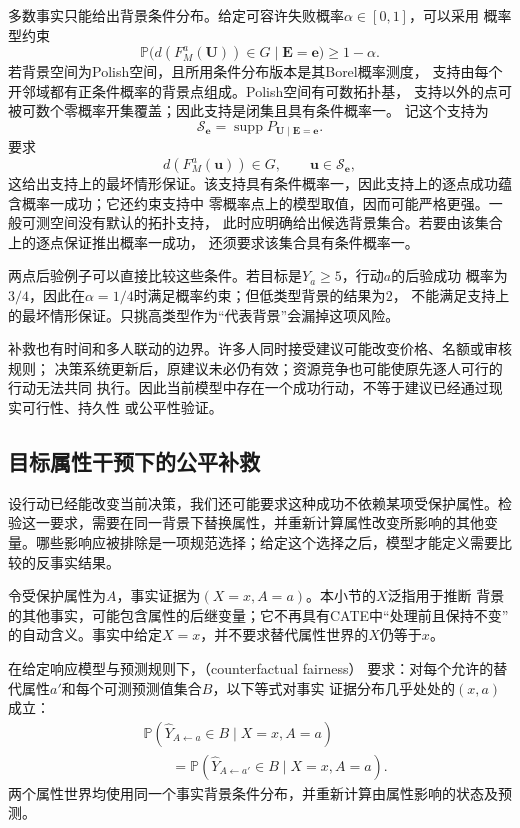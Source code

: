 多数事实只能给出背景条件分布。给定可容许失败概率\(\alpha\in[0,1]\)，可以采用
概率型约束
\begin{equation}
  \mathbb P\bigl(d(F_M^a(\bm U))\in G\mid\bm E=\bm e\bigr)
  \geq1-\alpha.
  \label{eq:causal-recourse-probability}
\end{equation}
若背景空间为Polish空间，且所用条件分布版本是其Borel概率测度，
支持由每个开邻域都有正条件概率的背景点组成。Polish空间有可数拓扑基，
支持以外的点可被可数个零概率开集覆盖；因此支持是闭集且具有条件概率一。
记这个支持为
\[
  \mathcal S_{\bm e}
  =\operatorname{supp}P_{\bm U\mid\bm E=\bm e}.
\]
要求
\begin{equation}
  d(F_M^a(\bm u))\in G,\qquad \bm u\in\mathcal S_{\bm e},
  \label{eq:causal-recourse-robust}
\end{equation}
这给出支持上的最坏情形保证。该支持具有条件概率一，因此支持上的逐点成功蕴含概率一成功；它还约束支持中
零概率点上的模型取值，因而可能严格更强。一般可测空间没有默认的拓扑支持，
此时应明确给出候选背景集合。若要由该集合上的逐点保证推出概率一成功，
还须要求该集合具有条件概率一。

两点后验例子可以直接比较这些条件。若目标是\(Y_a\geq5\)，行动\(a\)的后验成功
概率为\(3/4\)，因此在\(\alpha=1/4\)时满足概率约束；但低类型背景的结果为\(2\)，
不能满足支持上的最坏情形保证。只挑高类型作为“代表背景”会漏掉这项风险。

补救也有时间和多人联动的边界。许多人同时接受建议可能改变价格、名额或审核规则；
决策系统更新后，原建议未必仍有效；资源竞争也可能使原先逐人可行的行动无法共同
执行。因此当前模型中存在一个成功行动，不等于建议已经通过现实可行性、持久性
或公平性验证。

\subsection{目标属性干预下的公平补救}
\label{sec:causal-fair-recourse}

设行动已经能改变当前决策，我们还可能要求这种成功不依赖某项受保护属性。检验这一要求，需要在同一背景下替换属性，并重新计算属性改变所影响的其他变量。哪些影响应被排除是一项规范选择；给定这个选择之后，模型才能定义需要比较的反事实结果。

令受保护属性为\(A\)，事实证据为\((X=x,A=a)\)。本小节的\(X\)泛指用于推断
背景的其他事实，可能包含属性的后继变量；它不再具有CATE中“处理前且保持不变”
的自动含义。事实中给定\(X=x\)，并不要求替代属性世界的\(X\)仍等于\(x\)。
\begin{definition}[反事实公平]
  \label{def:causal-counterfactual-fairness}
  在给定响应模型与预测规则下，（counterfactual fairness）
  要求：对每个允许的替代属性\(a'\)和每个可测预测值集合\(B\)，以下等式对事实
  证据分布几乎处处的\((x,a)\)成立：
  \begin{equation}
    \begin{aligned}
      &\mathbb P(\widehat Y_{A\leftarrow a}\in B\mid X=x,A=a)\\
      &\qquad=
      \mathbb P(\widehat Y_{A\leftarrow a'}\in B\mid X=x,A=a).
    \end{aligned}
    \label{eq:causal-counterfactual-fairness}
  \end{equation}
  两个属性世界均使用同一个事实背景条件分布，并重新计算由属性影响的状态及预测。
\end{definition}

